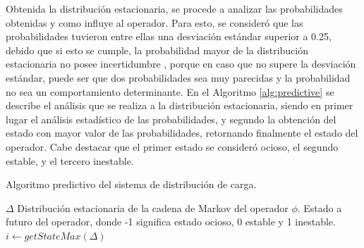 Obtenida la distribución estacionaria, se procede a analizar las probabilidades obtenidas y como influye al operador. Para esto, se consideró que las probabilidades tuvieron entre ellas una desviación estándar superior a 0.25, debido que si esto se cumple, la probabilidad mayor de la distribución estacionaria no posee incertidumbre \citep{soong2004fundamentals}, porque en caso que no supere la desviación estándar, puede ser que dos probabilidades sea muy parecidas y la probabilidad no sea un comportamiento determinante. En el Algoritmo \ref{alg:predictive} se describe el análisis que se realiza a la distribución estacionaria, siendo en primer lugar el análisis estadístico de las probabilidades, y segundo la obtención del estado con mayor valor de las probabilidades, retornando finalmente el estado del operador. Cabe destacar que el primer estado se consideró ocioso, el segundo estable, y el tercero inestable.

\begin{algorithm}[!ht]
	\caption{Algoritmo predictivo del sistema de distribución de carga.}
	\label{alg:predictive}
	\begin{algorithmic}[1]
	\REQUIRE$\Delta$ Distribución estacionaria de la cadena de Markov del operador $\phi$.
	\ENSURE Estado a futuro del operador, donde -1 significa estado ocioso, 0 estable y 1 inestable.
		\STATE $i \leftarrow getStateMax(\Delta)$ 
		\ELSE
		\ENDIF
	\ENDIF
	
	
	\end{algorithmic}
\end{algorithm}


